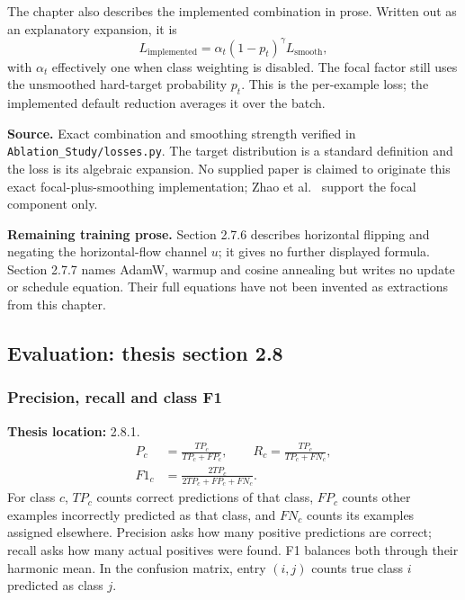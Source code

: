 \documentclass[11pt,a4paper]{article}
\numberwithin{equation}{section}
\begin{document}
The chapter also describes the implemented combination in prose. Written
out as an explanatory expansion, it is
\begin{equation}
    L_{\mathrm{implemented}}=\alpha_t(1-p_t)^\gamma L_{\mathrm{smooth}},
    \label{fg:eq:combined-loss}
\end{equation}
with $\alpha_t$ effectively one when class weighting is disabled. The focal
factor still uses the unsmoothed hard-target probability $p_t$. This is the
per-example loss; the implemented default reduction averages it over the batch.

\textbf{Source.} Exact combination and smoothing strength verified in
\texttt{Ablation\_Study/losses.py}. The target distribution is a standard
definition and the loss is its algebraic expansion. No supplied paper is
claimed to originate this exact focal-plus-smoothing implementation; Zhao
et al.~\cite{zhaoS2021} support the focal component only.

\textbf{Remaining training prose.} Section 2.7.6 describes horizontal flipping
and negating the horizontal-flow channel $u$; it gives no further displayed
formula. Section 2.7.7 names AdamW, warmup and cosine annealing but writes no
update or schedule equation. Their full equations have not been invented as
extractions from this chapter.

\subsection{Evaluation: thesis section 2.8}

\subsubsection{Precision, recall and class F1}
\label{fg:metrics}
\textbf{Thesis location:} 2.8.1.
\begin{equation}
\begin{aligned}
    P_c&=\frac{TP_c}{TP_c+FP_c},\qquad
    R_c=\frac{TP_c}{TP_c+FN_c},\\
    F1_c&=\frac{2TP_c}{2TP_c+FP_c+FN_c}.
\end{aligned}
    \label{fg:eq:metrics}
\end{equation}
For class $c$, $TP_c$ counts correct predictions of that class, $FP_c$ counts
other examples incorrectly predicted as that class, and $FN_c$ counts its
examples assigned elsewhere. Precision asks how many positive predictions
are correct; recall asks how many actual positives were found. F1 balances
both through their harmonic mean. In the confusion matrix, entry $(i,j)$
counts true class $i$ predicted as class $j$.
\end{document}

